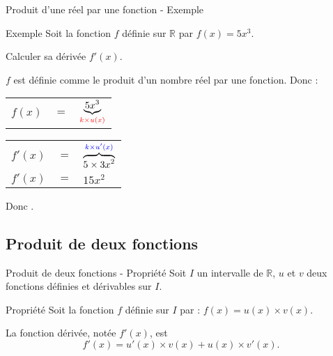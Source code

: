 \documentclass[12pt]{beamer}
\begin{document}
\begin{frame}{Produit d'une réel par une fonction - Exemple}
\begin{block}{Exemple}
Soit la fonction $f$ définie sur $\mathbb{R}$ par $f(x) = 5x^3$. \par 
Calculer sa dérivée $f'(x)$.
\end{block}

\medskip

$f$ est définie comme le produit d'un nombre réel par une fonction. Donc :

\medskip

\begin{tabular}{rcl}
$f(x)$ & $=$ & $\underbrace{5x^3}_{\textcolor{red}{k \times u(x)}}$
\end{tabular}

\medskip

\begin{tabular}{rcl}
$f'(x)$ & $=$ & $\overbrace{5 \times 3x^2}^{\textcolor{blue}{k \times u'(x)}}$ \\
$f'(x)$ & $=$ & $15x^2$
\end{tabular}

\medskip

Donc .

\end{frame}

\subsection{Produit de deux fonctions}

\begin{frame}{Produit de deux fonctions - Propriété}
Soit $I$ un intervalle de $\mathbb{R}$, $u$ et $v$ deux fonctions définies et dérivables sur $I$.

\medskip

\begin{exampleblock}{Propriété}
Soit la fonction $f$ définie sur $I$ par : $f(x) = u(x) \times v(x)$. \par 
La fonction dérivée, notée $f'(x)$, est \[ f'(x) = u'(x) \times v(x) + u(x) \times v'(x). \]
\end{exampleblock}
\end{frame}
\end{document}
